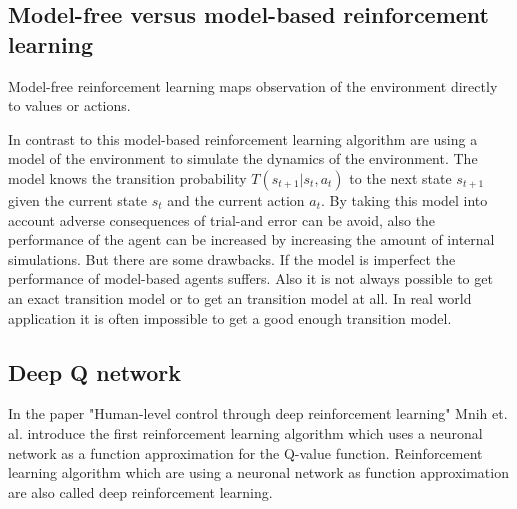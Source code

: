 

\subsection{Model-free versus model-based reinforcement learning}

Model-free reinforcement learning maps observation of the environment directly to values or actions.

In contrast to this model-based reinforcement learning algorithm are using a model of the environment to simulate the dynamics of the environment. The model knows the transition probability $T(s_{t+1} | s_t, a_t)$ to the next state $s_{t+1}$ given the current state $s_t$ and the current action $a_t$. By taking this model into account adverse consequences of trial-and error can be avoid, also the performance of the agent can be increased by increasing the amount of internal simulations.
But there are some drawbacks. If the model is imperfect the performance of model-based agents suffers. Also it is not always possible to get an exact transition model or to get an transition model at all. In real world application it is often impossible to get a good enough transition model.\\






\subsection{Deep Q network}

In the paper "Human-level control through deep reinforcement learning" Mnih et. al. \cite{dqn} introduce the first reinforcement learning algorithm which uses a neuronal network as a function approximation for the Q-value function. Reinforcement learning algorithm which are using a neuronal network as function approximation are also called deep reinforcement learning.\\


